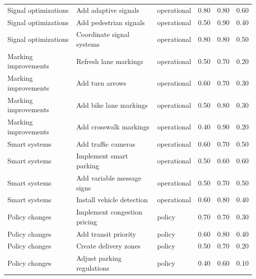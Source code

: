 \documentclass[11pt]{article}
\begin{document}
\begin{longtable}{P{0.19\textwidth} P{0.31\textwidth} P{0.13\textwidth} c c c}
Signal optimizations & Add adaptive signals & operational & 0.80 & 0.80 & 0.60 \\
Signal optimizations & Add pedestrian signals & operational & 0.50 & 0.90 & 0.40 \\
Signal optimizations & Coordinate signal systems & operational & 0.80 & 0.80 & 0.50 \\
Marking improvements & Refresh lane markings & operational & 0.50 & 0.70 & 0.20 \\
Marking improvements & Add turn arrows & operational & 0.60 & 0.70 & 0.30 \\
Marking improvements & Add bike lane markings & operational & 0.50 & 0.80 & 0.30 \\
Marking improvements & Add crosswalk markings & operational & 0.40 & 0.90 & 0.20 \\
Smart systems & Add traffic cameras & operational & 0.60 & 0.70 & 0.50 \\
Smart systems & Implement smart parking & operational & 0.50 & 0.60 & 0.60 \\
Smart systems & Add variable message signs & operational & 0.50 & 0.70 & 0.50 \\
Smart systems & Install vehicle detection & operational & 0.60 & 0.80 & 0.40 \\
Policy changes & Implement congestion pricing & policy & 0.70 & 0.70 & 0.30 \\
Policy changes & Add transit priority & policy & 0.60 & 0.80 & 0.40 \\
Policy changes & Create delivery zones & policy & 0.50 & 0.70 & 0.20 \\
Policy changes & Adjust parking regulations & policy & 0.40 & 0.60 & 0.10 \\
\bottomrule
\end{longtable}

\clearpage
\end{document}
